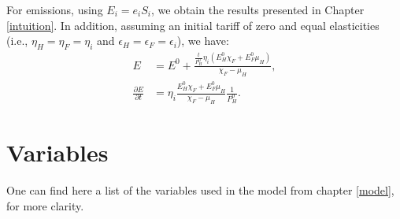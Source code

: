 For emissions, using $E_i = e_i S_i$, we obtain the results presented in Chapter \ref{intuition}. In addition, assuming an initial tariff of zero and equal elasticities (i.e., $\eta_H = \eta_F = \eta_i$ and $\epsilon_H = \epsilon_F = \epsilon_i$), we have:
\begin{align*}
    E                             & = E^0 + \frac{\frac{t}{P_H^0} \eta_i (E_H^0 \chi_F + E_F^0 \mu_H)}{\chi_F - \mu_H}, \\[1mm]
    \frac{\partial E}{\partial t} & = \eta_i \frac{E_H^0 \chi_F + E_F^0 \mu_H}{\chi_F - \mu_H}\frac{1}{P_H^0}.
\end{align*}

\section{Variables}\label{appendix:variables}

One can find here a list of the variables used in the model from chapter \ref{model}, for more clarity.

